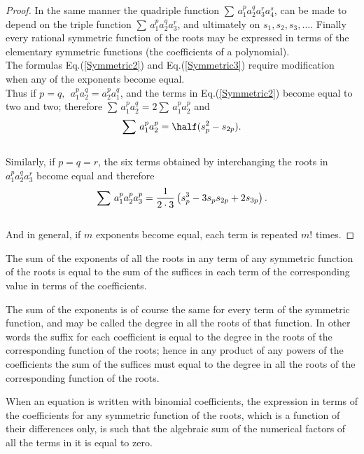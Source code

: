 \begin{proof}
In the same manner the quadriple function $\sum\, a_1^p a_2^q a_3^r a_4^s$, can be made to depend on the triple function $\sum\, a_1^p a_2^q a_3^r$, and ultimately on $s_1, s_2, s_3, \hdots$. Finally every rational 
symmetric function of the roots may be expressed in terms of the elementary symmetric functions (the coefficients of a polynomial). \\

The formulas Eq.(\ref{Symmetric2}) and Eq.(\ref{Symmetric3}) require modification when any of the exponents become equal. \\

Thus if $p = q,~~ a_1^p a_2^q = a_2^p a_1^q$, and the terms in Eq.(\ref{Symmetric2}) become equal to two and two; therefore $\sum\, a_1^p a_2^q = 2\sum\, a_1^p a_2^p$ and 
\[ \sum\, a_1^p a_2^p = \half(s_p^2 - s_{2p}). \]\\

Similarly, if $p = q = r$, the six terms obtained by interchanging the roots in $a_1^p a_2^q a_3^r$ become equal and therefore
\[ \sum\, a_1^p a_2^p a_3^p = {1\over 2\cdot3}\left( s_p^3 - 3s_p s_{2p} + 2s_{3p} \right). \]\\

And in general, if $m$ exponents become equal, each term is repeated $m!$ times.  
\end{proof}

\begin{theorem} The sum of the exponents of all the roots in any term of any symmetric function of the roots
is equal to the sum of the suffices in each term of the corresponding value in terms of the coefficients.
\end{theorem}

The sum of the exponents is of course the same for every term of the symmetric function, and may be called the degree in all the roots of that function. In other words
the suffix for each coefficient is equal to the degree in the roots of the corresponding function of the roots; hence in any product of any powers of the coefficients the sum of the
suffices must equal to the degree in all the roots of the corresponding function of the roots. 

\begin{theorem}
When an equation is written with binomial coefficients, the expression in terms of the coefficients for any symmetric function of the roots, which is a function 
of their differences only, is such that the algebraic sum of the numerical factors of all the terms in it is equal to zero. 
\end{theorem}

